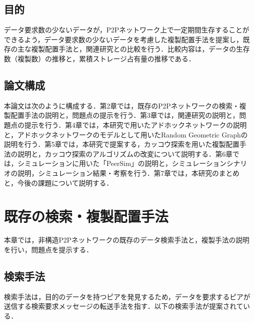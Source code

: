 \documentclass[11pt]{jreport}
\begin{document}
\section{目的}
データ要求数の少ないデータが，P2Pネットワーク上で一定期間生存することができるよう，データ要求数の少ないデータを考慮した複製配置手法を提案し，既存の主な複製配置手法と，関連研究との比較を行う．比較内容は，データの生存数（複製数）の推移と，累積ストレージ占有量の推移である．

\section{論文構成}
本論文は次のように構成する．第2章では，既存のP2Pネットワークの検索・複製配置手法の説明と，問題点の提示を行う．第3章では，関連研究の説明と，問題点の提示を行う．第4章では，本研究で用いたアドホックネットワークの説明と，アドホックネットワークのモデルとして用いたRandom Geometric Graphの説明を行う．第5章では，本研究で提案する，カッコウ探索を用いた複製配置手法の説明と，カッコウ探索のアルゴリズムの改変について説明する．第6章では，シミュレーションに用いた「PeerSim」の説明と，シミュレーションシナリオの説明，シミュレーション結果・考察を行う．第7章では，本研究のまとめと，今後の課題について説明する．



\chapter{既存の検索・複製配置手法}
本章では，非構造P2Pネットワークの既存のデータ検索手法と，複製手法の説明を行い，問題点を提示する．

\section{検索手法}
検索手法は，目的のデータを持つピアを発見するため，データを要求するピアが送信する検索要求メッセージの転送手法を指す．以下の検索手法が提案されている\cite{maruta}．
\end{document}
